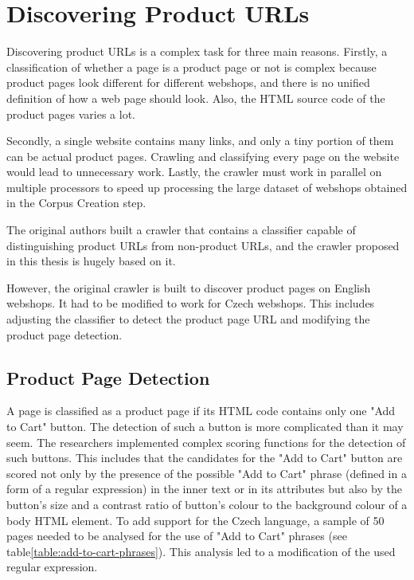     \section{Discovering Product URLs}
        Discovering product URLs is a complex task for three main reasons. Firstly, a classification of whether a page is a product page or not is complex because product pages look different for different webshops, and there is no unified definition of how a web page should look. Also, the HTML source code of the product pages varies a lot.

        Secondly, a single website contains many links, and only a tiny portion of them can be actual product pages. Crawling and classifying every page on the website would lead to unnecessary work.
        Lastly, the crawler must work in parallel on multiple processors to speed up processing the large dataset of webshops obtained in the Corpus Creation step.

        The original authors built a crawler that contains a classifier capable of distinguishing product URLs from non-product URLs, and the crawler proposed in this thesis is hugely based on it.

        However, the original crawler is built to discover product pages on English webshops. It had to be modified to work for Czech webshops. This includes adjusting the classifier to detect the product page URL and modifying the product page detection.

        \subsection{Product Page Detection}
        \label{section:product-page-detection}
        A page is classified as a product page if its HTML code contains only one "Add to Cart" button. The detection of such a button is more complicated than it may seem. The researchers implemented complex scoring functions for the detection of such buttons. This includes that the candidates for the "Add to Cart" button are scored not only by the presence of the possible "Add to Cart" phrase (defined in a form of a regular expression) in the inner text or in its attributes but also by the button's size and a contrast ratio of button's colour to the background colour of a body HTML element. To add support for the Czech language, a sample of 50 pages needed to be analysed for the use of "Add to Cart" phrases (see table\ref{table:add-to-cart-phrases}). This analysis led to a modification of the used regular expression.

